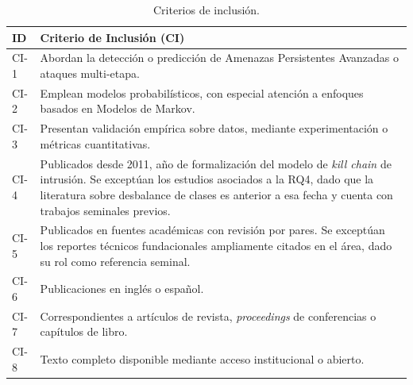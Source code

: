 \begin{table}[h!]
\centering
\small
\caption{Criterios de inclusión.}
\label{tab:inclusion}
\begin{tabular}{p{1.2cm} p{14.4cm}}
\hline
\textbf{ID} & \textbf{Criterio de Inclusión (CI)} \\
\hline
CI-1 & Abordan la detección o predicción de Amenazas Persistentes Avanzadas o ataques multi-etapa. \\
CI-2 & Emplean modelos probabilísticos, con especial atención a enfoques basados en Modelos de Markov. \\
CI-3 & Presentan validación empírica sobre datos, mediante experimentación o métricas cuantitativas. \\
CI-4 & Publicados desde 2011, año de formalización del modelo de \textit{kill chain} de intrusión. Se exceptúan los estudios asociados a la RQ4, dado que la literatura sobre desbalance de clases es anterior a esa fecha y cuenta con trabajos seminales previos. \\
CI-5 & Publicados en fuentes académicas con revisión por pares. Se exceptúan los reportes técnicos fundacionales ampliamente citados en el área, dado su rol como referencia seminal. \\
CI-6 & Publicaciones en inglés o español. \\
CI-7 & Correspondientes a artículos de revista, \textit{proceedings} de conferencias o capítulos de libro. \\
CI-8 & Texto completo disponible mediante acceso institucional o abierto. \\
\hline
\end{tabular}
\end{table}
\FloatBarrier

